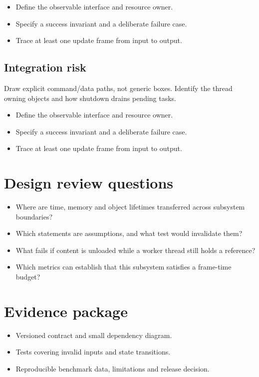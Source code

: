 \documentclass[11pt,letterpaper]{article}
\begin{document}
\begin{itemize}
\item Define the observable interface and resource owner.
\item Specify a success invariant and a deliberate failure case.
\item Trace at least one update frame from input to output.
\end{itemize}
\subsection{Integration risk}
Draw explicit command/data paths, not generic boxes. Identify the thread owning objects and how shutdown drains pending tasks.

\begin{itemize}
\item Define the observable interface and resource owner.
\item Specify a success invariant and a deliberate failure case.
\item Trace at least one update frame from input to output.
\end{itemize}
\section{Design review questions}
\begin{itemize}
\item Where are time, memory and object lifetimes transferred across subsystem boundaries?
\item Which statements are assumptions, and what test would invalidate them?
\item What fails if content is unloaded while a worker thread still holds a reference?
\item Which metrics can establish that this subsystem satisfies a frame-time budget?
\end{itemize}
\section{Evidence package}
\begin{itemize}
\item Versioned contract and small dependency diagram.
\item Tests covering invalid inputs and state transitions.
\item Reproducible benchmark data, limitations and release decision.
\end{itemize}
\end{document}
